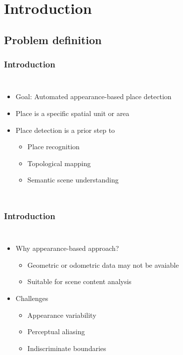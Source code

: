 \section{Introduction}
\subsection{Problem definition}
\frame
{
	\frametitle{Introduction}
	
	\begin{columns}[t,onlytextwidth]
		\hspace*{-1cm}
		
		\vspace{-0.5cm}
		\begin{itemize}
			\item Goal: Automated appearance-based place detection 
			\item Place is a specific spatial unit or area  
			\item Place detection is a prior step to
			\begin{itemize}
				\item Place recognition
				\item Topological mapping
				\item Semantic scene understanding
			\end{itemize}
		\end{itemize}
	\end{columns}
}
\frame
{
	\frametitle{Introduction}
	
	\begin{columns}[t,onlytextwidth]
		\hspace*{-1cm}
		
		\vspace{-0.5cm}
		\begin{itemize}
			\item Why appearance-based approach? 
			\begin{itemize}
				\item Geometric or odometric data may not be avaiable
				\item Suitable for scene content analysis 
			\end{itemize}
			\item Challenges
			\begin{itemize}
				\item Appearance variability
				\item Perceptual aliasing
				\item Indiscriminate boundaries
			\end{itemize}
		\end{itemize}
	\end{columns}
}
